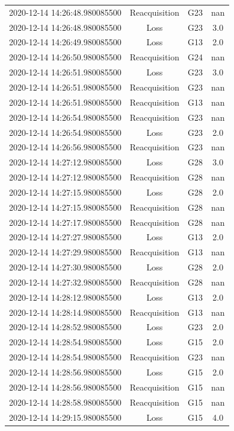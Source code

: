 \begin{enumerate}
\begin{longtabu}{cccc}
2020{-}12{-}14 14:26:48.980085500&Reacquisition&G23&nan\\%
2020{-}12{-}14 14:26:48.980085500&Loss&G23&3.0\\%
2020{-}12{-}14 14:26:49.980085500&Loss&G13&2.0\\%
2020{-}12{-}14 14:26:50.980085500&Reacquisition&G24&nan\\%
2020{-}12{-}14 14:26:51.980085500&Loss&G23&3.0\\%
2020{-}12{-}14 14:26:51.980085500&Reacquisition&G23&nan\\%
2020{-}12{-}14 14:26:51.980085500&Reacquisition&G13&nan\\%
2020{-}12{-}14 14:26:54.980085500&Reacquisition&G23&nan\\%
2020{-}12{-}14 14:26:54.980085500&Loss&G23&2.0\\%
2020{-}12{-}14 14:26:56.980085500&Reacquisition&G23&nan\\%
2020{-}12{-}14 14:27:12.980085500&Loss&G28&3.0\\%
2020{-}12{-}14 14:27:12.980085500&Reacquisition&G28&nan\\%
2020{-}12{-}14 14:27:15.980085500&Loss&G28&2.0\\%
2020{-}12{-}14 14:27:15.980085500&Reacquisition&G28&nan\\%
2020{-}12{-}14 14:27:17.980085500&Reacquisition&G28&nan\\%
2020{-}12{-}14 14:27:27.980085500&Loss&G13&2.0\\%
2020{-}12{-}14 14:27:29.980085500&Reacquisition&G13&nan\\%
2020{-}12{-}14 14:27:30.980085500&Loss&G28&2.0\\%
2020{-}12{-}14 14:27:32.980085500&Reacquisition&G28&nan\\%
2020{-}12{-}14 14:28:12.980085500&Loss&G13&2.0\\%
2020{-}12{-}14 14:28:14.980085500&Reacquisition&G13&nan\\%
2020{-}12{-}14 14:28:52.980085500&Loss&G23&2.0\\%
2020{-}12{-}14 14:28:54.980085500&Loss&G15&2.0\\%
2020{-}12{-}14 14:28:54.980085500&Reacquisition&G23&nan\\%
2020{-}12{-}14 14:28:56.980085500&Loss&G15&2.0\\%
2020{-}12{-}14 14:28:56.980085500&Reacquisition&G15&nan\\%
2020{-}12{-}14 14:28:58.980085500&Reacquisition&G15&nan\\%
2020{-}12{-}14 14:29:15.980085500&Loss&G15&4.0\\%

\end{longtabu}
\end{enumerate}
